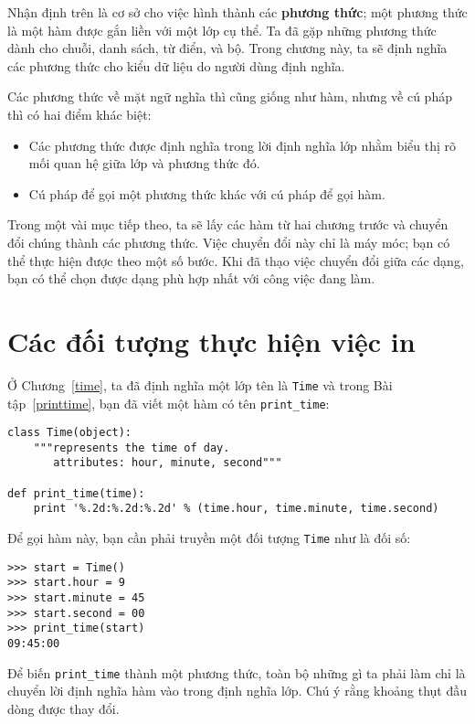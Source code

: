 \documentclass[11pt]{book}
\begin{document}

Nhận định trên là cơ sở cho việc hình thành các {\bf phương thức}; một
phương thức là một hàm được gắn liền với một lớp cụ thể. Ta đã gặp
những phương thức dành cho chuỗi, danh sách, từ điển, và bộ. Trong
chương này, ta sẽ định nghĩa các phương thức cho kiểu dữ liệu
do người dùng định nghĩa.


Các phương thức về mặt ngữ nghĩa thì cũng giống như hàm, nhưng về
cú pháp thì có hai điểm khác biệt:

\begin{itemize}

\item Các phương thức được định nghĩa trong lời định nghĩa lớp nhằm
biểu thị rõ mối quan hệ giữa lớp và phương thức đó.

\item Cú pháp để gọi một phương thức khác với cú pháp để gọi hàm.

\end{itemize}

Trong một vài mục tiếp theo, ta sẽ lấy các hàm từ hai chương trước
và chuyển đổi chúng thành các phương thức. Việc chuyển đổi này 
chỉ là máy móc; bạn có thể thực hiện được theo một số bước. 
Khi đã thạo việc chuyển đổi giữa các dạng, bạn có thể chọn được
dạng phù hợp nhất với công việc đang làm.


\section{Các đối tượng thực hiện việc in}
\label{print_time}


Ở Chương~\ref{time}, ta đã định nghĩa một lớp tên là
{\tt Time} và trong Bài tập~\ref{printtime}, bạn đã viết
một hàm có tên \verb"print_time":

\beforeverb
\begin{verbatim}
class Time(object):
    """represents the time of day.
       attributes: hour, minute, second"""

def print_time(time):
    print '%.2d:%.2d:%.2d' % (time.hour, time.minute, time.second)
\end{verbatim}
\afterverb
%
Để gọi hàm này, bạn cần phải truyền một đối tượng {\tt Time} như 
là đối số:

\beforeverb
\begin{verbatim}
>>> start = Time()
>>> start.hour = 9
>>> start.minute = 45
>>> start.second = 00
>>> print_time(start)
09:45:00
\end{verbatim}
\afterverb
%
Để biến \verb"print_time" thành một phương thức, toàn bộ những
gì ta phải làm chỉ là chuyển lời định nghĩa hàm vào trong định nghĩa lớp.
Chú ý rằng khoảng thụt đầu dòng được thay đổi.
\end{document}
